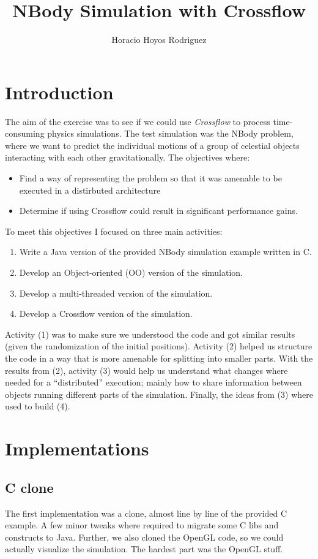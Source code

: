 \documentclass[11pt,a4paper]{article}
\author{Horacio Hoyos Rodriguez}
\title{NBody Simulation with Crossflow}
\begin{document}
\maketitle
    
\section{Introduction}
The aim of the exercise was to see if we could use \emph{Crossflow} to process time-consuming physics simulations.
The test simulation was the NBody problem, where we want to predict the individual motions of a group of celestial objects interacting with each other gravitationally.
The objectives where:
\begin{itemize}
    \item Find a way of representing the problem so that it was amenable to be executed in a distirbuted architecture
    \item Determine if using Crossflow could result in significant performance gains. 
\end{itemize}

To meet this objectives I focused on three main activities:
\begin{enumerate}
    \item Write a Java version of the provided NBody simulation example written in C.
    \item Develop an Object-oriented (OO) version of the simulation.
    \item Develop a multi-threaded version of the simulation.
    \item Develop a Crossflow version of the simulation.
\end{enumerate}

Activity (1) was to make sure we understood the code and got similar results (given the randomization of the initial positions).
Activity (2) helped us structure the code in a way that is more amenable for splitting into smaller parts.
With the results from (2), activity (3) would help us understand what changes where needed for a ``distributed'' execution; mainly how to share information between objects running different parts of the simulation.
Finally, the ideas from (3) where used to build (4).

\section{Implementations}
\subsection{C clone}
The first implementation was a clone, almost line by line of the provided C example.
A few minor tweaks where required to migrate some C libs and constructs to Java.
Further, we also cloned the OpenGL code, so we could actually visualize the simulation.
The hardest part was the OpenGL stuff.
\end{document}
